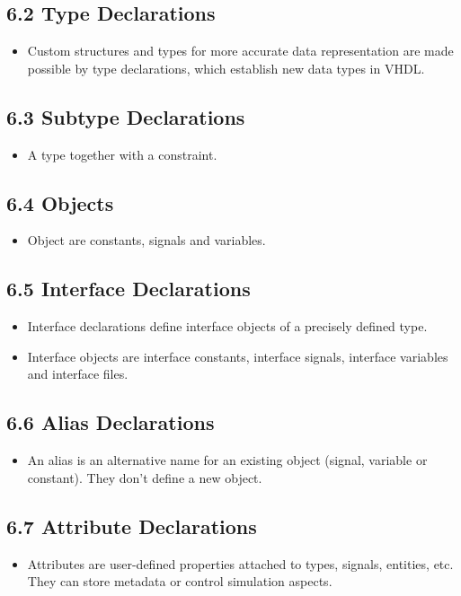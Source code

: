 \documentclass[a4paper,12pt]{article}
\begin{document}
	\subsection*{6.2 Type Declarations}
	\begin{itemize}
		\item Custom structures and types for more accurate data representation are made possible by type declarations, which establish new data types in VHDL.
	\end{itemize}
	
	\subsection*{6.3 Subtype Declarations}
	\begin{itemize}
		\item A type together with a constraint.
	\end{itemize}
	
	\subsection*{6.4 Objects}
	\begin{itemize}
		\item Object are constants, signals and variables.
	\end{itemize}
	
	\subsection*{6.5 Interface Declarations}
	\begin{itemize}
		\item Interface declarations define interface objects of a precisely defined type.
		\item Interface objects are interface constants, interface signals, interface variables and interface files.
	\end{itemize}
	
	\subsection*{6.6 Alias Declarations}
	\begin{itemize}
		\item An alias is an alternative name for an existing object (signal, variable or constant). They don't define a new object.
	\end{itemize}
	
	\subsection*{6.7 Attribute Declarations}
	\begin{itemize}
		\item Attributes are user-defined properties attached to types, signals, entities, etc. They can store metadata or control simulation aspects.
	\end{itemize}
	
\end{document}
